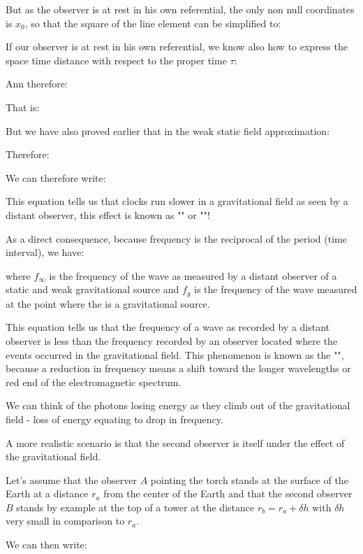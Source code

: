 	But as the observer is at rest in his own referential, the only non null coordinates is $x_0$, so that the square of the line element can be simplified to:
	
	If our observer is at rest in his own referential, we know also how to express the space time distance with respect to the proper time $\tau$:
	
	Ann therefore:
	
	That is:
	
	But we have also proved earlier that in the weak static field approximation:
	
	Therefore:
	
	We can therefore write:
	
	This equation tells us that clocks run slower in a gravitational field as seen by a distant observer, this effect is known as "" or ""!
	
	As a direct consequence, because frequency is the reciprocal of the period (time interval), we have:
	
	 
	where $f_{\infty}$ is the frequency of the wave as measured by a distant observer of a static and weak gravitational source and $f_g$ is the frequency of the wave measured at the point where the is a gravitational source.
	
	This equation tells us that the frequency of a wave as recorded by a distant observer is less than the frequency recorded by an observer located where the events occurred in the gravitational field. This phenomenon is known as the "", because a reduction in frequency means a shift toward the longer wavelengths or red end of the electromagnetic spectrum.
	
	We can think of the photons losing energy as they climb out of the gravitational field - loss of energy equating to drop in frequency.
	
	A more realistic scenario is that the second observer is itself under the effect of the gravitational field.

	Let's assume that the observer $A$ pointing the torch stands at the surface of the Earth at a distance $r_a$ from the center of the Earth and that the second observer $B$ stands by example at the top of a tower at the distance $r_b = r_a + \delta h$ with $\delta h$ very small in comparison to $r_a$.
	
	We can then write:
	
